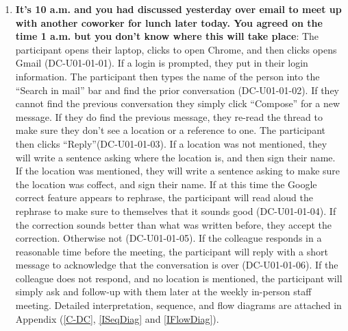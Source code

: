 \documentclass[acmsmall,screen,authorversion,nonacm]{acmart}
\begin{document}
\begin{center}
\begin{enumerate}
    \item \textbf{It’s 10 a.m. and you had discussed yesterday over email to meet up with another coworker for lunch later today. You agreed on the time 1 a.m. but you don’t know where this will take place}: The participant opens their laptop, clicks to open Chrome, and then clicks opens Gmail (DC-U01-01-01). If a login is prompted, they put in their login information. The participant then types the name of the person into the “Search in mail” bar and find the prior conversation (DC-U01-01-02). If they cannot find the previous conversation they simply click “Compose” for a new message. If they do find the previous message, they re-read the thread to make sure they don’t see a location or a reference to one. The participant then clicks “Reply”(DC-U01-01-03). If a location was not mentioned, they will write a sentence asking where the location is, and then sign their name. If the location was mentioned, they will write a sentence asking to make sure the location was coffect, and sign their name. If at this time the Google correct feature appears to rephrase, the participant will read aloud the rephrase to make sure to themselves that it sounds good (DC-U01-01-04). If the correction sounds better than what was written before, they accept the correction. Otherwise not (DC-U01-01-05). If the colleague responds in a reasonable time before the meeting, the participant will reply with a short message to acknowledge that the conversation is over (DC-U01-01-06). If the colleague does not respond, and no location is mentioned, the participant will simply ask and follow-up with them later at the weekly in-person staff meeting. Detailed interpretation, sequence, and flow diagrams are attached in Appendix (\ref{C-DC}, \ref{ISeqDiag} and \ref{IFlowDiag}). 
    

\end{enumerate}
\end{center}
\end{document}
